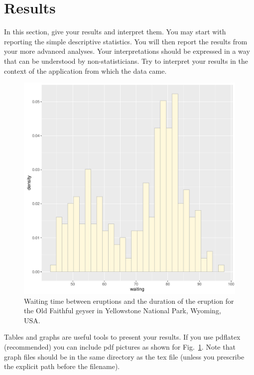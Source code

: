\documentclass[a4paper,amsmath, 12pt]{article}
\begin{document}
\section{Results}
In this section, give your results and interpret them. You may start with reporting the simple descriptive statistics. You will then report the results from your more advanced analyses.  Your interpretations should be expressed in a way that can be understood by non-statisticians. Try to interpret your results in the context of the application from which the data came.


\begin{figure}[h]
\begin{center}
\includegraphics[scale=0.5]{figures/histogram.pdf}
\caption{\label{fig:hist} Waiting time between eruptions and the duration of the eruption for the Old Faithful geyser in Yellowstone National Park, Wyoming, USA.}
\end{center}
\end{figure}

Tables and graphs are useful tools to present your results. If you use pdflatex (recommended) you can include pdf pictures as shown for Fig.~\ref{fig:hist}.
Note that graph files should be in the same directory as the tex file (unless you prescribe the explicit path before the filename).
\end{document}
